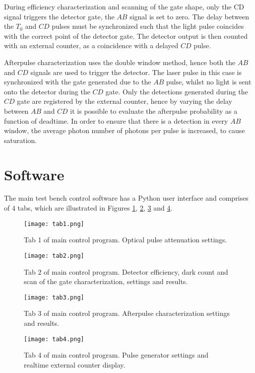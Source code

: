\documentclass{article}
\begin{document}
During efficiency characterization and scanning of the gate shape, only the CD signal triggers the detector gate, the $AB$ signal is set to zero. The delay between the $T_0$ and $CD$ pulses must be synchronized such that the light pulse coincides with the correct point of the detector gate. The detector output is then counted with an external counter, as a coincidence with a delayed $CD$ pulse. 

Afterpulse characterization uses the double window method, hence both the $AB$ and $CD$ signals are used to trigger the detector. The laser pulse in this case is synchronized with the gate generated due to the $AB$ pulse, whilst no light is sent onto the detector during the $CD$ gate. Only the detections generated during the $CD$ gate are registered by the external counter, hence by varying the delay between $AB$ and $CD$ it is possible to evaluate the afterpulse probability as a function of deadtime. In order to ensure that there is a detection in every $AB$ window, the average photon number of photons per pulse is increased, to cause saturation.  


\section{Software}

The main test bench control software has a Python user interface and comprises of 4 tabs, which are illustrated in Figures \ref{tab1}, \ref{tab2}, \ref{tab3} and \ref{tab4}. 

\begin{figure}
\centering
\texttt{[image: tab1.png]}
\caption{Tab 1 of main control program. Optical pulse attenuation settings.}
\label{tab1}
\end{figure}

\begin{figure}
\centering
\texttt{[image: tab2.png]}
\caption{Tab 2 of main control program. Detector efficiency, dark count and scan of the gate characterization, settings and results.}
\label{tab2}
\end{figure}

\begin{figure}
\centering
\texttt{[image: tab3.png]}
\caption{Tab 3 of main control program. Afterpulse characterization settings and results.}
\label{tab3}
\end{figure}

\begin{figure}
\centering
\texttt{[image: tab4.png]}
\caption{Tab 4 of main control program. Pulse generator settings and realtime external counter display.}
\label{tab4}
\end{figure}
\end{document}
